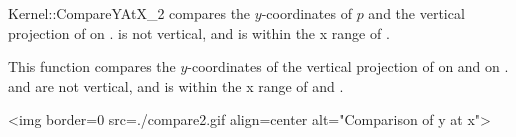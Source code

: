 \begin{ccRefFunctionObjectConcept}{Kernel::CompareYAtX_2}
{compares the $y$-coordinates of $p$ and the vertical projection
 of  on .
 \ccPrecond {} is not vertical, and  is within the
 x range of .}

{This function compares the $y$-coordinates of the vertical projection 
 of  on  and on .
 \ccPrecond {} and  are not vertical, and
  is within the x range of  and .}


\begin{ccHtmlOnly}
<img border=0 src=./compare2.gif align=center alt="Comparison of y at x">
\end{ccHtmlOnly} 

\ccSeeAlso
{}\\

\end{ccRefFunctionObjectConcept}
